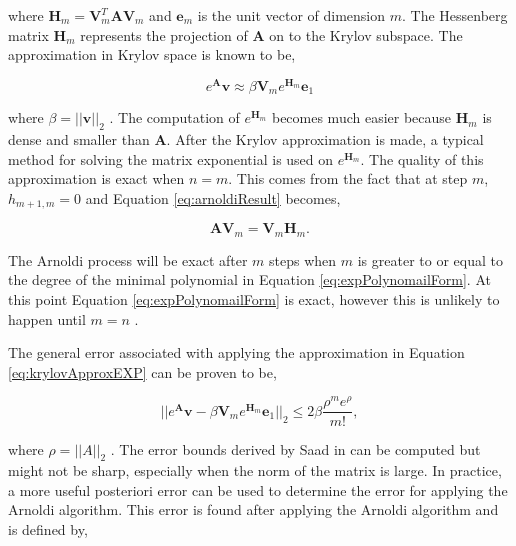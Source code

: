\noindent where $\boldsymbol{H}_{m} = \boldsymbol{V}^{T}_{m}\boldsymbol{A}\boldsymbol{V}_{m}$ and $\boldsymbol{e}_{m}$ is the unit vector of dimension $m$. The Hessenberg matrix $\boldsymbol{H}_{m}$ represents the projection of $\boldsymbol{A}$ on to the Krylov subspace. The approximation in Krylov space is known to be, 

\begin{equation}
    e^{\boldsymbol{A}}\boldsymbol{v} \approx \beta \boldsymbol{V}_{m}e^{\boldsymbol{H}_{m}}\boldsymbol{e}_{1}
    \label{eq:krylovApproxEXP}
\end{equation}

\noindent where $\beta = ||\boldsymbol{v}||_{2}$ \cite{saad1989}. The computation of $e^{
\boldsymbol{H}_{m}}$ becomes much easier because $\boldsymbol{H}_{m}$ is dense and smaller than $\boldsymbol{A}$. After the Krylov approximation is made, a typical method for solving the matrix exponential is used on $e^{\boldsymbol{H}_{m}}$. The quality of this approximation is exact when $n = m$. This comes from the fact that at step $m$, $h_{m+1,m} = 0$ and Equation \ref{eq:arnoldiResult} becomes,

\begin{equation}
    \boldsymbol{A}\boldsymbol{V}_{m} = \boldsymbol{V}_{m}\boldsymbol{H}_{m}.
\end{equation}

\noindent The Arnoldi process will be exact after $m$ steps when $m$ is greater to or equal to the degree of the minimal polynomial in Equation \ref{eq:expPolynomailForm}. At this point Equation \ref{eq:expPolynomailForm} is exact, however this is unlikely to happen until $m=n$ \cite{saad1992} \cite{saad1989}. 

 The general error associated with applying the approximation in Equation \ref{eq:krylovApproxEXP} can be proven to be,
 
 \begin{equation}
     ||e^{\boldsymbol{A}}\boldsymbol{v} - \beta \boldsymbol{V}_{m}e^{\boldsymbol{H}_{m}}\boldsymbol{e}_{1}||_{2} \leq 2\beta \frac{\rho^{m}e^{\rho}}{m!},
 \end{equation}
 
 \noindent where $\rho = ||A||_{2}$ \cite{saad1992}. The error bounds derived by Saad in \cite{saad1992} can be computed but might not be sharp, especially when the norm of the matrix is large. In practice, a more useful posteriori error can be used to determine the error for applying the Arnoldi algorithm. This error is found after applying the Arnoldi algorithm and is defined by,
 
